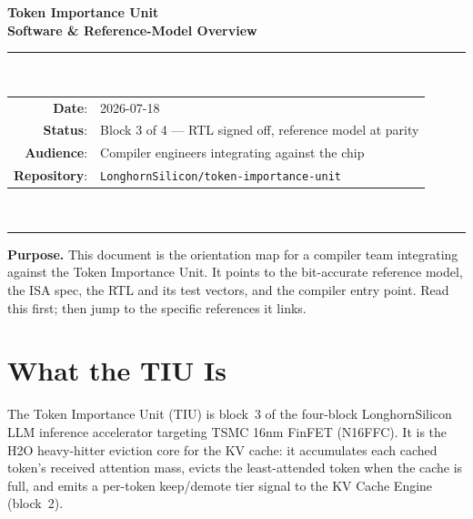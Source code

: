 \documentclass[11pt]{article}
\begin{document}
\thispagestyle{empty}
\begin{center}
\vspace*{1.2in}
{\Huge\bfseries Token Importance Unit}\\[0.4em]
{\LARGE\bfseries Software \& Reference-Model Overview}\\[1.5em]

\rule{0.7\textwidth}{0.4pt}\\[1em]

\begin{tabular}{rl}
\textbf{Date}:       & 2026-07-18 \\
\textbf{Status}:     & Block 3 of 4 --- RTL signed off, reference model at parity \\
\textbf{Audience}:   & Compiler engineers integrating against the chip \\
\textbf{Repository}: & \texttt{LonghornSilicon/token-importance-unit} \\
\end{tabular}\\[1em]
\rule{0.7\textwidth}{0.4pt}

\vfill
\begin{minipage}{0.85\textwidth}
\small
\textbf{Purpose.} This document is the orientation map for a compiler team
integrating against the Token Importance Unit. It points to the bit-accurate
reference model, the ISA spec, the RTL and its test vectors, and the compiler
entry point. Read this first; then jump to the specific references it links.
\end{minipage}

\vspace{0.3in}
\end{center}

\clearpage
\tableofcontents
\clearpage

\section{What the TIU Is}
\label{sec:what}

The Token Importance Unit (TIU) is block~3 of the four-block LonghornSilicon LLM
inference accelerator targeting TSMC 16nm FinFET (N16FFC). It is the H2O
heavy-hitter eviction core for the KV cache: it accumulates each cached token's
received attention mass, evicts the least-attended token when the cache is full,
and emits a per-token keep/demote tier signal to the KV Cache Engine (block~2).
\end{document}
